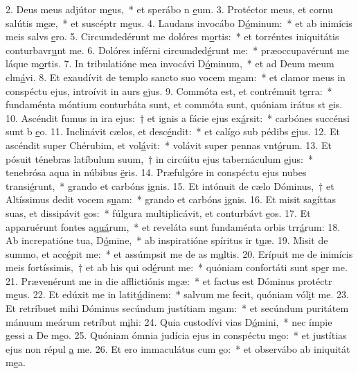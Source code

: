 2. Deus meus adjútor m\uline{e}us,~* et sperábo n \uline{e}um.
3. Protéctor meus, et cornu salútis m\uline{e}æ,~* et suscéptr m\uline{e}us.
4. Laudans invocábo D\uline{ó}minum:~* et ab inimícis meis salvs \uline{e}ro.
5. Circumdedérunt me dolóres m\uline{o}rtis:~* et torréntes iniquitátis conturbavr\uline{u}nt me.
6. Dolóres inférni circumded\uline{é}runt me:~* præoccupavérunt me láque m\uline{o}rtis.
7. In tribulatióne mea invocávi D\uline{ó}minum,~* et ad Deum meum clm\uline{á}vi.
8. Et exaudívit de templo sancto suo vocem m\uline{e}am:~* et clamor meus in conspéctu ejus, introívit in aurs \uline{e}jus.
9. Commóta est, et contrémuit t\uline{e}rra:~* fundaménta móntium conturbáta sunt, et commóta sunt, quóniam irátus st \uline{e}is.
10. Ascéndit fumus in ira ejus:~† et ignis a fácie ejus ex\uline{á}rsit:~* carbónes succénsi sunt b \uline{e}o.
11. Inclinávit cælos, et desc\uline{é}ndit:~* et calígo sub pédibs \uline{e}jus.
12. Et ascéndit super Chérubim, et vol\uline{á}vit:~* volávit super pennas vnt\uline{ó}rum.
13. Et pósuit ténebras latíbulum suum,~† in circúitu ejus tabernáculum \uline{e}jus:~* tenebrósa aqua in núbibus \uline{ë}ris.
14. Præfulgóre in conspéctu ejus nubes transi\uline{é}runt,~* grando et carbóns \uline{i}gnis.
15. Et intónuit de cælo Dóminus,~† et Altíssimus dedit vocem s\uline{u}am:~* grando et carbóns \uline{i}gnis.
16. Et misit sagíttas suas, et dissipávit \uline{e}os:~* fúlgura multiplicávit, et conturbávt \uline{e}os.
17. Et apparuérunt fontes a\uline{quá}rum,~* et reveláta sunt fundaménta orbis trr\uline{á}rum:
18. Ab increpatióne tua, D\uline{ó}mine,~* ab inspiratióne spíritus ir t\uline{u}æ.
19. Misit de summo, et acc\uline{é}pit me:~* et assúmpsit me de as m\uline{u}ltis.
20. Erípuit me de inimícis meis fortíssimis,~† et ab his qui od\uline{é}runt me:~* quóniam confortáti sunt sp\uline{e}r me.
21. Prævenérunt me in die afflictiónis m\uline{e}æ:~* et factus est Dóminus protéctr m\uline{e}us.
22. Et edúxit me in latit\uline{ú}dinem:~* salvum me fecit, quóniam vól\uline{i}t me.
23. Et retríbuet mihi Dóminus secúndum justítiam m\uline{e}am:~* et secúndum puritátem mánuum meárum retríbut m\uline{i}hi:
24. Quia custodívi vias D\uline{ó}mini,~* nec ímpie gessi a De m\uline{e}o.
25. Quóniam ómnia judícia ejus in conspéctu m\uline{e}o:~* et justítias ejus non répul \uline{a} me.
26. Et ero immaculátus cum \uline{e}o:~* et observábo ab iniquitát m\uline{e}a.
